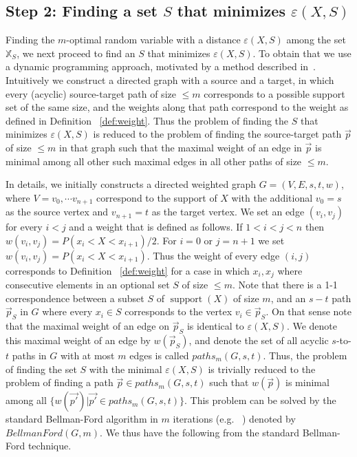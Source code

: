 \documentclass{article}
\DeclareMathOperator{\support}{support}
\begin{document}


\subsection*{Step 2: Finding a set $S$ that minimizes $\varepsilon(X,S)$}

Finding the $m$-optimal random variable with a distance  $\varepsilon(X,S)$ among the set $\mathbb{X}_S$, we next proceed to find an $S$ that minimizes $\varepsilon(X,S)$. To obtain that we use a dynamic programming approach, motivated by a method described in~\cite{chakravarty1982partitioning}. Intuitively we construct a directed graph with a source and a target, in which every (acyclic)  source-target path of size $\leq m$ corresponds to a possible support set of the same size, and the weights along that path correspond to the weight as defined in Definition ~\ref{def:weight}. Thus the problem of finding the $S$ that minimizes $\varepsilon(X,S)$ is reduced to the problem of finding the source-target path $\vec{p}$ of size $\leq m$ in that graph such that the maximal weight of an edge in $\vec{p}$ is minimal among all other such maximal edges in all other paths of size $\leq m$. 

In details, we initially constructs a directed weighted graph $G=(V,E,s,t,w)$, where $V=v_0,\cdots v_{n+1}$ correspond to the support of $X$ with the additional  $v_0 = s$  as the source vertex and $v_{n+1}=t$ as the target vertex. We set an edge $(v_i,v_j)$ for every $i<j$ and a weight that is defined as follows. If $1<i<j<n$ then $w(v_i,v_j)=P(x_i<X<x_{i+1})/2$. For $i=0$ or $j=n+1$ we set $w(v_i,v_j)=P(x_i<X<x_{i+1})$. Thus the weight of every edge $(i,j)$ corresponds to Definition ~\ref{def:weight} for a case in which $x_i,x_j$ where consecutive elements in an optional set $S$ of size $\leq m$. Note that there is a 1-1 correspondence between a subset $S$ of $\support(X)$ of size $m$, and an $s-t$ path $\vec{p}_S$ in $G$ where every $x_i\in S$ corresponds to the vertex $v_i\in \vec{p}_S$. On that sense note that the maximal weight of an edge on $\vec{p}_S$ is identical to $\varepsilon(X,S)$. We denote this maximal weight of an edge  by $w(\vec{p}_S)$, and denote the set of all acyclic $s$-to-$t$ paths in $G$ with at most $m$ edges is called $paths_m(G, s, t)$. Thus, the problem of finding the set $S$ with the minimal  $\varepsilon(X,S)$ is trivially reduced to the problem of finding a path $\vec{p}\in paths_m(G, s, t)$ such that $w(\vec{p})$ is minimal among all $\{w(\vec{p'}) | \vec{p'}\in paths_m(G, s, t)\}$. This problem can be solved by the standard Bellman-Ford algorithm in $m$ iterations (e.g. ~\cite{guerin2002computing, shufan2011two}) denoted by $BellmanFord(G,m)$. We thus have the following from the standard Bellman-Ford technique.
\end{document}
